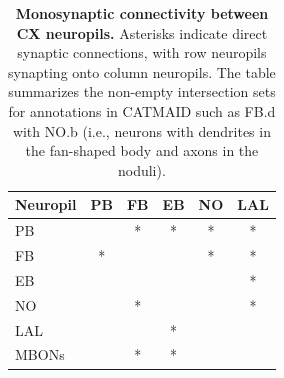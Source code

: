         \begin{table}[H]
        \centering
        \begin{tabular}{l|ccccc}
            \toprule
            Neuropil & PB & FB & EB & NO & LAL \\
            \midrule
            PB &  & * & * & * & * \\
            FB & * & & & * & * \\
            EB & & & & & * \\
            NO & & * & & & * \\
            LAL & & & * & & \\ %
            MBONs &  & * & * & & \\
            \bottomrule
        \end{tabular}
        \caption[Monosynaptic connectivity between CX neuropils]{\textbf{Monosynaptic connectivity between CX neuropils.} Asterisks indicate direct synaptic connections, with row neuropils synapting onto column neuropils. The table summarizes the non-empty intersection sets for annotations in CATMAID such as FB.d with NO.b (i.e., neurons with dendrites in the fan-shaped body and axons in the noduli).}
        \label{inputsoutputs}
        \end{table}
